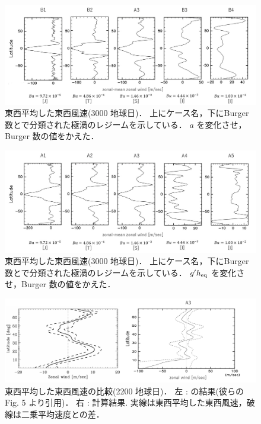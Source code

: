 \documentclass[a4j,12pt,openbib,oneside]{jreport}
\begin{document}
%
\clearpage
\newpage
%
\begin{figure}[ht]
  \begin{center}
    \includegraphics[clip,width=14cm]{./fig/result/case1/case1_vellon_a.jpg}
    \caption{
      \footnotesize{東西平均した東西風速(3000 地球日)．
上にケース名，下にBurger 数と\cite{Brueshaber2019}で分類された極渦のレジームを示している．
$a$ を変化させ，Burger 数の値をかえた．
      }
    }
    \label{fig:case1_vellon_a}
  \end{center}
\end{figure}
%
%
\begin{figure}[ht]
  \begin{center}
    \includegraphics[clip,width=14cm]{./fig/result/case1/case1_vellon_gh.jpg}
    \caption{
      \footnotesize{東西平均した東西風速(3000 地球日)．
上にケース名，下にBurger 数と\cite{Brueshaber2019}で分類された極渦のレジームを示している．
$g'h_{\rm{eq}}$ を変化させ，Burger 数の値をかえた．
      }
    }
    \label{fig:case1_vellon_gh}
  \end{center}
\end{figure}
%
\begin{figure}[ht]
  \begin{center}
    \includegraphics[clip,width=14cm]{./fig/result/case1/case1_rms_comp.png}
    \caption{
      \footnotesize{東西平均した東西風速の比較(2200 地球日)．
左 : \cite{Showman2007} の結果(彼らのFig. 5 より引用)．
右 : 計算結果.
実線は東西平均した東西風速，破線は二乗平均速度との差．
      }
    }
    \label{fig:case1_rms_comp}
  \end{center}
\end{figure}
%
%
\clearpage
\newpage
\end{document}
